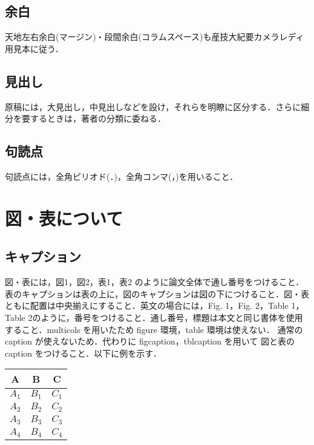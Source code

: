 \begin{multicols}{2}
\subsection{余白}
天地左右余白(マージン)・段間余白(コラムスペース)も産技大紀要カメラレディ用見本に従う．

\subsection{見出し}
原稿には，大見出し，中見出しなどを設け，それらを明瞭に区分する．さらに細分を要するときは，著者の分類に委ねる．

\subsection{句読点}
句読点には，全角ピリオド(．)，全角コンマ(，)を用いること．


\section{図・表について}
\subsection{キャプション}
図・表には，図1，図2，表1，表2 のように論文全体で通し番号をつけること．
表のキャプションは表の上に，図のキャプションは図の下につけること．図・表
ともに配置は中央揃えにすること．英文の場合には，Fig. 1，Fig. 2，Table 1，
Table 2のように，番号をつけること．通し番号，標題は本文と同じ書体を使用
すること．multicols を用いたため figure 環境，table 環境は使えない．
通常の caption が使えないため．代わりに figcaption，tblcaption を用いて
図と表の caption をつけること．以下に例を示す．
\label{tab:cost2}
\begin{center}
\begin{tabular}{|c|c|c|} \hline
A & B & C \\ \hline
$A_{1}$ & $B_{1}$ & $C_{1}$ \\ \hline
$A_{2}$ & $B_{2}$ & $C_{2}$ \\ \hline
$A_{3}$ & $B_{3}$ & $C_{3}$ \\ \hline
$A_{4}$ & $B_{4}$ & $C_{4}$ \\ \hline
\end{tabular}
\end{center}


\end{multicols}
